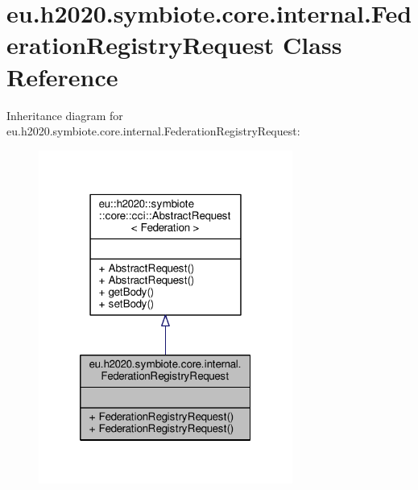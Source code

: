 \hypertarget{classeu_1_1h2020_1_1symbiote_1_1core_1_1internal_1_1FederationRegistryRequest}{}\section{eu.\+h2020.\+symbiote.\+core.\+internal.\+Federation\+Registry\+Request Class Reference}
\label{classeu_1_1h2020_1_1symbiote_1_1core_1_1internal_1_1FederationRegistryRequest}


Inheritance diagram for eu.\+h2020.\+symbiote.\+core.\+internal.\+Federation\+Registry\+Request\+:
\nopagebreak
\begin{figure}[H]
\begin{center}
\leavevmode
\includegraphics[width=236pt]{classeu_1_1h2020_1_1symbiote_1_1core_1_1internal_1_1FederationRegistryRequest__inherit__graph}
\end{center}
\end{figure}


